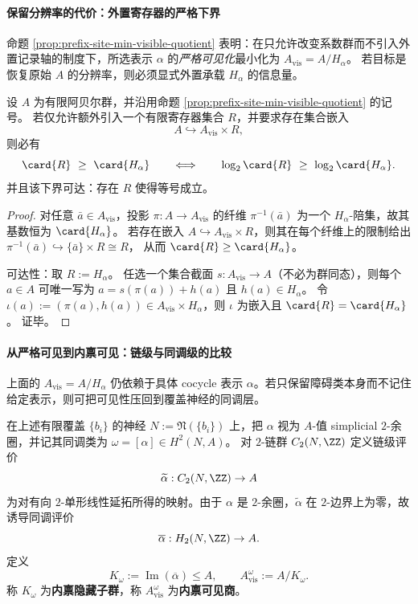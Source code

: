 \paragraph{保留分辨率的代价：外置寄存器的严格下界}
命题 \ref{prop:prefix-site-min-visible-quotient} 表明：在只允许改变系数群而不引入外置记录轴的制度下，所选表示 \(\alpha\) 的\emph{严格可见化}最小化为 \(A_{\mathrm{vis}}=A/H_\alpha\)。
若目标是恢复原始 \(A\) 的分辨率，则必须显式外置承载 \(H_\alpha\) 的信息量。

\begin{theorem}[恢复 \(A\)-分辨率所需的最小寄存器容量]\label{thm:prefix-site-register-lower-bound}
设 \(A\) 为有限阿贝尔群，并沿用命题 \ref{prop:prefix-site-min-visible-quotient} 的记号。
若仅允许额外引入一个有限寄存器集合 \(R\)，并要求存在集合嵌入
\[
A\hookrightarrow A_{\mathrm{vis}}\times R,
\]
则必有
\[
\card{R}\ \ge\ \card{H_\alpha}
\qquad\Longleftrightarrow\qquad
\log_2\card{R}\ \ge\ \log_2\card{H_\alpha}.
\]
并且该下界可达：存在 \(R\) 使得等号成立。
\end{theorem}

\begin{proof}
对任意 \(\bar a\in A_{\mathrm{vis}}\)，投影 \(\pi:A\to A_{\mathrm{vis}}\) 的纤维 \(\pi^{-1}(\bar a)\) 为一个 \(H_\alpha\)-陪集，故其基数恒为 \(\card{H_\alpha}\)。
若存在嵌入 \(A\hookrightarrow A_{\mathrm{vis}}\times R\)，则其在每个纤维上的限制给出
\(
\pi^{-1}(\bar a)\hookrightarrow \{\bar a\}\times R\cong R
\)，
从而 \(\card{R}\ge \card{H_\alpha}\)。
\par
可达性：取 \(R:=H_\alpha\)。
任选一个集合截面 \(s:A_{\mathrm{vis}}\to A\)（不必为群同态），则每个 \(a\in A\) 可唯一写为 \(a=s(\pi(a))+h(a)\) 且 \(h(a)\in H_\alpha\)。
令 \(\iota(a):=(\pi(a),h(a))\in A_{\mathrm{vis}}\times H_\alpha\)，则 \(\iota\) 为嵌入且 \(\card{R}=\card{H_\alpha}\)。
证毕。
\end{proof}

\paragraph{从严格可见到内禀可见：链级与同调级的比较}
上面的 \(A_{\mathrm{vis}}=A/H_\alpha\) 仍依赖于具体 cocycle 表示 \(\alpha\)。若只保留障碍类本身而不记住给定表示，则可把可见性压回到覆盖神经的同调层。

\begin{definition}[内禀隐藏子群与内禀可见商]\label{def:prefix-site-intrinsic-visible-quotient}
在上述有限覆盖 \(\{b_i\}\) 的神经 \(N:=\mathfrak N(\{b_i\})\) 上，把 \(\alpha\) 视为 \(A\)-值 simplicial \(2\)-余圈，并记其同调类为 \(\omega=[\alpha]\in H^2(N,A)\)。
对 \(2\)-链群 \(C_2(N,\ZZ)\) 定义链级评价
\[
\widetilde\alpha:C_2(N,\ZZ)\to A
\]
为对有向 \(2\)-单形线性延拓所得的映射。由于 \(\alpha\) 是 \(2\)-余圈，\(\widetilde\alpha\) 在 \(2\)-边界上为零，故诱导同调评价
\[
\overline\alpha:H_2(N,\ZZ)\to A.
\]
定义
\[
K_\omega:=\operatorname{Im}(\overline\alpha)\le A,
\qquad
A_{\mathrm{vis}}^\omega:=A/K_\omega.
\]
称 \(K_\omega\) 为\textbf{内禀隐藏子群}，称 \(A_{\mathrm{vis}}^\omega\) 为\textbf{内禀可见商}。
\end{definition}

